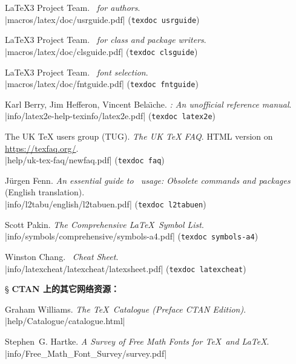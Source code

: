 \begin{thebibliography}{20}
 \LaTeX3 Project Team.
  \newblock \emph{\LaTeXe\ for authors}.\\
  \CTAN|macros/latex/doc/usrguide.pdf| (\texttt{texdoc usrguide})

 \LaTeX3 Project Team.
  \newblock \emph{\LaTeXe\ for class and package writers}. \\
  \CTAN|macros/latex/doc/clsguide.pdf| (\texttt{texdoc clsguide})

 \LaTeX3 Project Team.
  \newblock \emph{\LaTeXe\ font selection}. \\
  \CTAN|macros/latex/doc/fntguide.pdf| (\texttt{texdoc fntguide})

 Karl Berry, Jim Hefferon, Vincent Bela\"{\i}che.
  \newblock \emph{\LaTeXe: An unofficial reference manual}. \\
  \CTAN|info/latex2e-help-texinfo/latex2e.pdf| (\texttt{texdoc latex2e})

 The UK TeX users group (TUG).
  \newblock \emph{The UK TeX FAQ}. 
  \newblock HTML version on \url{https://texfaq.org/}. \\
  \CTAN|help/uk-tex-faq/newfaq.pdf| (\texttt{texdoc faq})

 J\"{u}rgen Fenn.
  \newblock \emph{An essential guide to \LaTeXe\ usage: Obsolete commands and packages} (English translation). \\
  \CTAN|info/l2tabu/english/l2tabuen.pdf| (\texttt{texdoc l2tabuen})

 Scott Pakin.
  \newblock \emph{The Comprehensive \LaTeX\ Symbol List}. \\
  \CTAN|info/symbols/comprehensive/symbols-a4.pdf| (\texttt{texdoc symbols-a4})

 Winston Chang.
  \newblock \emph{\LaTeXe\ Cheat Sheet}. \\
  \CTAN|info/latexcheat/latexcheat/latexsheet.pdf| (\texttt{texdoc latexcheat})

\item[\S] {\bfseries CTAN 上的其它网络资源：}

 Graham Williams.
  \newblock \emph{The \TeX\ Catalogue (Preface CTAN Edition)}.\\
  \CTAN|help/Catalogue/catalogue.html|

 Stephen~G. Hartke.
  \newblock \emph{A Survey of Free Math Fonts for \TeX\ and \LaTeX}.\\
  \CTAN|info/Free_Math_Font_Survey/survey.pdf|


\end{thebibliography}
